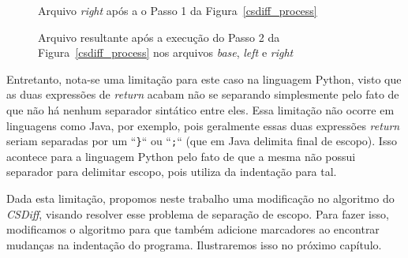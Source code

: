 \begin{figure}[ht]
	\begin{center}
		
        \caption{Arquivo \emph{right} após a o Passo 1 da
        Figura~\ref{csdiff_process}}\label{right_marcadores}
	\end{center}
\end{figure}

\begin{figure}[ht]
	\begin{center}
		
        \caption{Arquivo resultante após a execução do Passo 2 da
        Figura~\ref{csdiff_process} nos arquivos \emph{base}, \emph{left} e
    \emph{right}}\label{diff3_marcadores}
	\end{center}
\end{figure}

Entretanto, nota-se uma limitação para este caso na linguagem Python, visto que
as duas expressões de \emph{return} acabam não se separando simplesmente pelo
fato de que não há nenhum separador sintático entre eles. Essa limitação não
ocorre em linguagens como Java, por exemplo, pois geralmente essas duas
expressões \emph{return} seriam separadas por um ``\verb|}|`` ou ``\verb|;|``
(que em Java delimita final de escopo). Isso acontece para a linguagem Python
pelo fato de que a mesma não possui separador para delimitar escopo, pois
utiliza da indentação para tal.

Dada esta limitação, propomos neste trabalho uma modificação no algoritmo do
\emph{CSDiff}, visando resolver esse problema de separação de escopo. Para
fazer isso, modificamos o algoritmo para que também adicione marcadores ao
encontrar mudanças na indentação do programa. Ilustraremos isso no próximo
capítulo.


